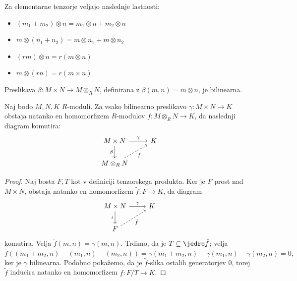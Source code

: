 
Za elementarne tenzorje veljajo naslednje lastnosti:
\begin{itemize}
\item $(m_1 + m_2) \otimes n = m_1 \otimes n + m_2 \otimes n$
\item $m \otimes (n_1 + n_2) = m \otimes n_1 + m \otimes n_2$
\item $(rm) \otimes n = r(m \otimes n)$
\item $m \otimes (rn) = r (m \times n)$
\end{itemize}

\begin{opomba}
  Preslikava $\beta: M \times N \to M \otimes_R N$, definirana z $\beta(m,n) = m
  \otimes n$, je bilinearna.
\end{opomba}

\begin{izrek}
  Naj bodo $M, N, K$ $R$-moduli.
  Za vsako bilinearno preslikavo $\gamma : M \times N \to K$ obstaja natanko en
  homomorfizem $R$-modulov $f: M \otimes_R N \to K$, da naslednji diagram
  komutira:
  \[\begin{tikzcd}
	  {M \times N} & K \\
	  {M \otimes_R N}
	  \arrow["\gamma", from=1-1, to=1-2]
	  \arrow["\beta"', from=1-1, to=2-1]
	  \arrow["f"', dashed, from=2-1, to=1-2]
	\end{tikzcd}\]
\end{izrek}

\begin{proof}
  Naj bosta $F, T$ kot v definiciji tenzorskega produkta.
  Ker je $F$ prost nad $M \times N$, obstaja natanko en homomorfizem $\tilde{f}:
  F \to K$, da diagram
  \[\begin{tikzcd}
	  {M \times N} & K \\
	  F
	  \arrow["\gamma", from=1-1, to=1-2]
	  \arrow["\iota"', from=1-1, to=2-1]
	  \arrow["{\tilde{f}}"', dashed, from=2-1, to=1-2]
	\end{tikzcd}\]
  komutira.
  Velja $\tilde{f}(m, n) = \gamma(m, n)$.
  Trdimo, da je $T \subseteq \jedro \tilde{f}$; velja
  \[
	\tilde{f}((m_1 + m_2, n) - (m_1, n) - (m_2, n))
	= \gamma(m_1 + m_2, n) - \gamma(m_1, n) - \gamma(m_2, n)
	= 0,
  \]
  ker je $\gamma$ bilinearna.
  Podobno pokažemo, da je $\tilde{f}$-slika ostalih generatorjev $0$, torej
  $\tilde{f}$ inducira natanko en homomorfizem $f: F/T \to K$.
\end{proof}

